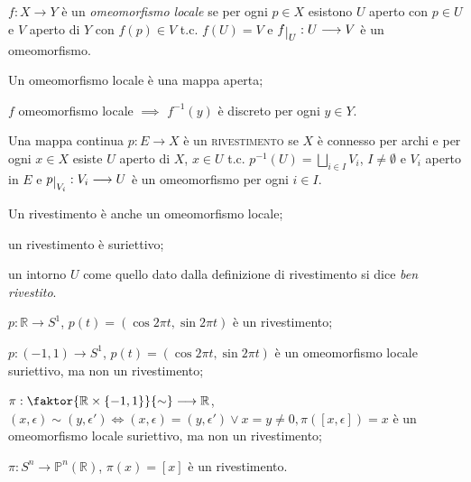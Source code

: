 \begin{defn}
  $f:X \longrightarrow Y$ è un \textit{omeomorfismo locale} se per ogni $p \in X$ esistono $U$ aperto con $p \in U$ e $V$ aperto di $Y$ con $f(p) \in V$ t.c. $f(U)=V$ e $f \restrict{U}:U \longrightarrow V$ è un omeomorfismo.
\end{defn}

\begin{ftt}
  \begin{nlist}
    \item Un omeomorfismo locale è una mappa aperta;
    \item $f$ omeomorfismo locale $\implies$ $f^{-1}(y)$ è discreto per ogni $y \in Y$.
  \end{nlist}
\end{ftt}

\begin{defn}
  Una mappa continua $p:E \longrightarrow X$ è un \textsc{rivestimento} se $X$ è connesso per archi e per ogni $x \in X$ esiste $U$ aperto di $X$, $x \in U$ t.c. $\displaystyle p^{-1}(U)=\bigsqcup_{i \in I} V_i$, $I \not=\emptyset$ e $V_i$ aperto in $E$ e $p \restrict{V_i}:V_i \longrightarrow U$ è un omeomorfismo per ogni $i \in I$.
\end{defn}

\begin{ftt}
  \begin{nlist}
    \item Un rivestimento è anche un omeomorfismo locale;
    \item un rivestimento è suriettivo;
    \item un intorno $U$ come quello dato dalla definizione di rivestimento si dice \textit{ben rivestito}.
  \end{nlist}
\end{ftt}

\begin{ex}
  \begin{nlist}
    \item $p: \mathbb{R} \longrightarrow S^1$, $p(t)=(\cos{2\pi t}, \sin{2\pi t})$ è un rivestimento;
    \item $p: (-1, 1) \longrightarrow S^1$, $p(t)=(\cos{2\pi t}, \sin{2\pi t})$ è un omeomorfismo locale suriettivo, ma non un rivestimento;
    \item $\pi: \faktor{ \mathbb{R} \times \{ -1, 1 \} }{\sim} \longrightarrow \mathbb{R}$, $(x, \epsilon) \sim (y, \epsilon') \Leftrightarrow (x, \epsilon)=(y, \epsilon') \lor x=y \not=0, \pi([x, \epsilon])=x$ è un omeomorfismo locale suriettivo, ma non un rivestimento;
    \item $\pi: S^n \longrightarrow \mathbb{P}^n(\mathbb{R})$, $\pi(x)=[x]$ è un rivestimento.\
  \end{nlist}
\end{ex}

